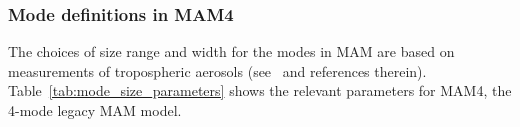 %
%
%

\subsubsection*{Mode definitions in MAM4}

The choices of size range and width for the modes in MAM are based on
measurements of tropospheric aerosols (see~\cite{Easter2004} and references therein).
Table~\ref{tab:mode_size_parameters} shows the relevant parameters for MAM4,
the 4-mode legacy MAM model.

